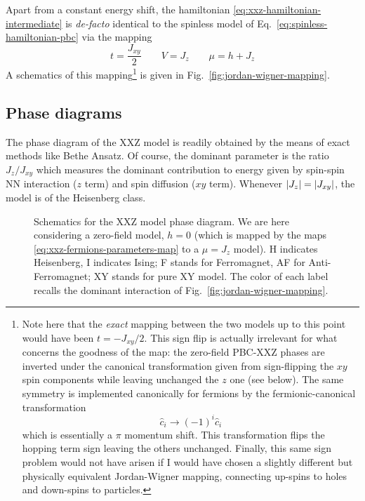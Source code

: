 Apart from a constant energy shift, the hamiltonian \eqref{eq:xxz-hamiltonian-intermediate} is \textit{de-facto} identical to the spinless model of Eq.~\eqref{eq:spinless-hamiltonian-pbc} via the mapping
\begin{equation}\label{eq:xxz-fermions-parameters-map}
	t = \frac{J_{xy}}{2}
	\qquad
	V = J_z
	\qquad
	\mu = h + J_z
\end{equation}
A schematics of this mapping\footnote{
	Note here that the \textit{exact} mapping between the two models up to this point would have been $t = - J_{xy}/2$. This sign flip is actually irrelevant for what concerns the goodness of the map: the zero-field PBC-$\mathrm{XXZ}$ phases are inverted under the canonical transformation given from sign-flipping the $xy$ spin components while leaving unchanged the $z$ one (see below). The same symmetry is implemented canonically for fermions by the fermionic-canonical transformation
	\[
	\hat c_i \to (-1)^i \hat c_i
	\]
	which is essentially a $\pi$ momentum shift. This transformation flips the hopping term sign leaving the others unchanged. Finally, this same sign problem would not have arisen if I would have chosen a slightly different but physically equivalent Jordan-Wigner mapping, connecting up-spins to holes and down-spins to particles.
} is given in Fig.~\ref{fig:jordan-wigner-mapping}.

\subsection*{Phase diagrams}

The phase diagram of the $\mathrm{XXZ}$ model is readily obtained by the means of exact methods like Bethe Ansatz. Of course, the dominant parameter is the ratio $J_z/J_{xy}$ which measures the dominant contribution to energy given by spin-spin NN interaction ($z$ term) and spin diffusion ($xy$ term). Whenever $\abs{J_z} = \abs{J_{xy}}$, the model is of the Heisenberg class.

\begin{figure}
	\centering
	
	\caption{Schematics for the $\mathrm{XXZ}$ model phase diagram. We are here considering a zero-field model, $h=0$ (which is mapped by the maps \eqref{eq:xxz-fermions-parameters-map} to a $\mu = J_z$ model). H indicates Heisenberg, I indicates Ising; F stands for Ferromagnet, AF for Anti-Ferromagnet; XY stands for pure $\mathrm{XY}$ model. The color of each label recalls the dominant interaction of Fig.~\ref{fig:jordan-wigner-mapping}.}
	\label{fig:xxz-phase-diagram}
\end{figure}

